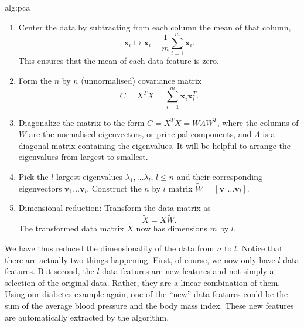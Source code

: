 \begin{algbox}{alg:pca}
\begin{enumerate}
    \item 
    Center the data by subtracting from each column the mean of that column,
    \begin{equation}
        \bm{x}_i \mapsto \bm{x}_{i} - \frac{1}{m} \sum_{i=1}^{m} \bm{x}_{i}.
    \end{equation}
    This ensures that the mean of each data feature is zero.
    \item 
    Form the $n$ by $n$ (unnormalised) covariance matrix
    \begin{equation}
        C = {X}^{T}{X} = \sum_{i=1}^{m} \bm{x}_{i}\bm{x}_{i}^{T}.
        \label{eqn: PCA Covariance Matrix}
    \end{equation} 
    \item 
    Diagonalize the matrix to the form $C = {X}^{T}{X} = W\Lambda W^{T}$, where the columns of $W$ are the normalised eigenvectors, or principal components, and $\Lambda$ is a diagonal matrix containing the eigenvalues. It will be helpful to arrange the eigenvalues from largest to smallest.
    \item 
    Pick the $l$ largest eigenvalues $\lambda_1, \dots \lambda_l$, $l\leq n$ and their corresponding eigenvectors $\bm{v}_1 \dots \bm{v}_l$. Construct the $n$ by $l$ matrix $\widetilde{W} = [\bm{v}_1 \dots \bm{v}_l]$.
    \item 
    Dimensional reduction: Transform the data matrix as
    \begin{equation} \label{eqn: PCA Dimensional Reduction}
        \widetilde{X} = X\widetilde{W}.
    \end{equation} 
    The transformed data matrix $\widetilde{X}$ now has dimensions $m$ by $l$.
\end{enumerate}
\end{algbox}

We have thus reduced the dimensionality of the data from $n$ to $l$. Notice that there are actually two things happening: First, of course, we now only have $l$ data features. But second, the $l$ data features are new features and not simply a selection of the original data. Rather, they are a linear combination of them. Using our diabetes example again, one of the ``new'' data features could be the sum of the average blood pressure and the body mass index. These new features are automatically extracted by the algorithm.

